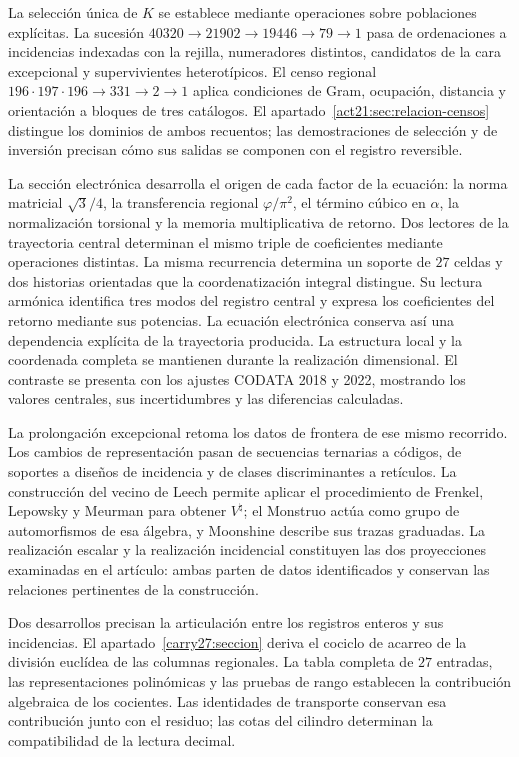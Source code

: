 La selección única de \(K\) se establece mediante operaciones sobre
poblaciones explícitas. La sucesión
\(40320\to21902\to19446\to79\to1\) pasa de ordenaciones a
incidencias indexadas con la rejilla, numeradores distintos, candidatos de
la cara excepcional y supervivientes heterotípicos. El censo regional
\(196\cdot197\cdot196\to331\to2\to1\) aplica condiciones de Gram,
ocupación, distancia y orientación a bloques de tres catálogos.
El apartado~\ref{act21:sec:relacion-censos} distingue los dominios de
ambos recuentos; las demostraciones de selección y de inversión precisan
cómo sus salidas se componen con el registro reversible.

La sección electrónica desarrolla el origen de cada factor de la ecuación:
la norma matricial \(\sqrt3/4\), la transferencia regional
\(\varphi/\pi^2\), el término cúbico en \(\alpha\), la normalización
torsional y la memoria multiplicativa de retorno. Dos lectores de la
trayectoria central determinan el mismo triple de coeficientes mediante
operaciones distintas. La misma recurrencia determina un soporte de
\(27\) celdas y dos historias orientadas que la coordenatización integral distingue.
Su lectura armónica identifica tres modos del registro central y expresa
los coeficientes del retorno mediante sus potencias. La ecuación electrónica
conserva así una dependencia explícita de la trayectoria producida.
La estructura local y la coordenada completa se
mantienen durante la realización dimensional. El contraste se presenta
con los ajustes CODATA 2018 y 2022\cite{codata2018,codata2022}, mostrando
los valores centrales, sus incertidumbres y las diferencias calculadas.

La prolongación excepcional retoma los datos de frontera de ese mismo
recorrido. Los cambios de representación pasan de secuencias ternarias a
códigos, de soportes a diseños de incidencia y de clases discriminantes a
retículos. La construcción del vecino de Leech permite aplicar el
procedimiento de Frenkel, Lepowsky y Meurman para obtener \(V^\natural\);
el Monstruo actúa como grupo de automorfismos de esa álgebra, y Moonshine
describe sus trazas graduadas\cite{flm,borcherds}. La realización escalar
y la realización incidencial constituyen las dos proyecciones examinadas
en el artículo: ambas parten de datos identificados y conservan las
relaciones pertinentes de la construcción.

Dos desarrollos precisan la articulación entre los registros enteros
y sus incidencias. El apartado~\ref{carry27:seccion} deriva el cociclo
de acarreo de la división euclídea de las columnas regionales. La tabla
completa de \(27\) entradas, las representaciones polinómicas y las
pruebas de rango establecen la contribución algebraica de los cocientes.
Las identidades de transporte conservan esa contribución junto con el
residuo; las cotas del cilindro determinan la compatibilidad de la
lectura decimal.

